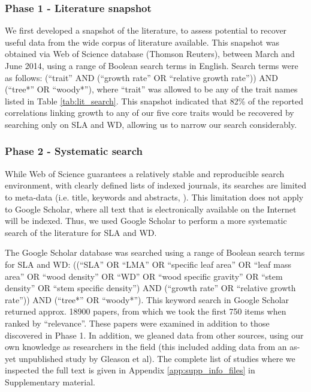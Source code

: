 \documentclass[a4paper,11pt]{article}
\begin{document}
\subsubsection*{Phase 1 - Literature snapshot}\label{literature-snapshot}

We first developed a snapshot of the literature, to assess potential to recover useful data from the wide corpus of literature available. This snapshot was obtained via Web of Science database (Thomson Reuters), between March and June 2014, using a range of Boolean search terms in English. Search terms were as follows: (``trait'' AND (``growth rate'' OR ``relative growth rate'')) AND (``tree*'' OR ``woody*''), where ``trait'' was allowed to be any of the trait names listed in Table \ref{tab:lit_search}. This snapshot indicated that 82\% of the reported correlations linking growth to any of our five core traits would be recovered by searching only on SLA and WD, allowing us to narrow our search considerably.

\subsubsection*{Phase 2 - Systematic search}\label{systematic-search}

While Web of Science guarantees a relatively stable and reproducible search environment, with clearly defined lists of indexed journals, its searches are limited to meta-data (i.e. title, keywords and abstracts, \citealt{Beckmann:2012hn}). This limitation does not apply to Google Scholar, where all text that is electronically available on the Internet will be indexed. Thus, we used Google Scholar to perform a more systematic search of the literature for SLA and WD.

The Google Scholar database was searched using a range of Boolean search terms for SLA and WD: ((``SLA'' OR ``LMA'' OR ``specific leaf area'' OR ``leaf mass area'' OR ``wood density'' OR ``WD'' OR ``wood specific gravity'' OR ``stem density'' OR ``stem specific density'') AND (``growth rate'' OR ``relative growth rate'')) AND (``tree*'' OR ``woody*''). This keyword search in Google Scholar returned approx. 18900 papers, from which we took the first 750 items when ranked by ``relevance''.
These papers were examined in addition to those discovered in Phase 1. In addition, we gleaned data from other sources, using our own knowledge as researchers in the field (this included adding data from an as-yet unpublished study by Gleason et al).  The complete list of studies where we inspected the full text is given in Appendix \ref{app:supp_info_files} in Supplementary material.
\end{document}
